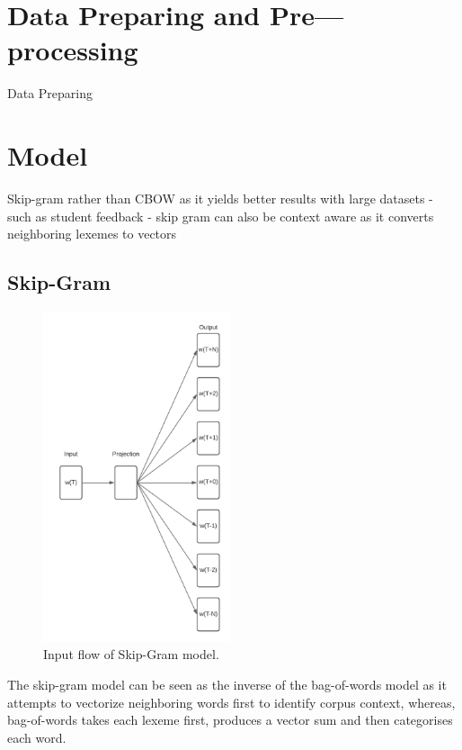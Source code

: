 \section{Data Preparing and Pre---processing}

Data Preparing

\section{Model}

Skip-gram rather than CBOW as it yields better results with large datasets - such as student feedback - skip gram can also be context aware as it converts neighboring lexemes to vectors

\subsection{Skip-Gram}

\begin{figure}[H]
    \centering
    \includegraphics[width=0.49\textwidth]{figures/chapter-5/SkipGramModel.pdf}
    \caption[SkipGramModel]{Input flow of Skip-Gram model.
    \label{fig:SkipGramModel}}
\end{figure}

The skip-gram model can be seen as the inverse of the bag-of-words model as it attempts to vectorize neighboring words first to identify corpus context, whereas, bag-of-words takes each lexeme first, produces a vector sum and then categorises each word.